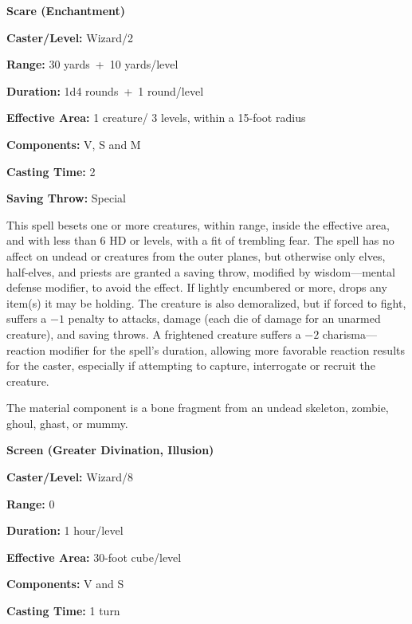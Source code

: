 \begin{multicols}{2}
\begin{minipage}{\columnwidth}
\noindent \textbf{Scare (Enchantment)}

\noindent \textbf{Caster/Level:} Wizard/2

\noindent \textbf{Range:} 30 yards~+~10 yards/level

\noindent \textbf{Duration:} 1d4 rounds~+~1 round/level

\noindent \textbf{Effective Area:} 1 creature/ 3 levels, within a 15-foot radius

\noindent \textbf{Components:} V, S and M

\noindent \textbf{Casting Time:} 2

\noindent \textbf{Saving Throw:} Special

\end{minipage}

This spell besets one or more creatures, within range, inside the effective area, and with less than 6 HD or levels, with a fit of trembling fear.  The spell has no affect on undead or creatures from the outer planes, but otherwise only elves, half-elves, and priests are granted a saving throw, modified by wisdom---mental defense modifier, to avoid the effect.  If lightly encumbered or more, drops any item(s) it may be holding.  The creature is also demoralized, but if forced to fight, suffers a $-1$ penalty to attacks, damage (each die of damage for an unarmed creature), and saving throws.  A frightened creature suffers a $-2$ charisma---reaction modifier for the spell's duration, allowing more favorable reaction results for the caster, especially if attempting to capture, interrogate or recruit the creature.

The material component is a bone fragment from an undead skeleton, zombie, ghoul, ghast, or mummy.

\vspace{1em}

\noindent
\begin{minipage}{\columnwidth}

\noindent \textbf{Screen (Greater Divination, Illusion)}

\noindent \textbf{Caster/Level:} Wizard/8

\noindent \textbf{Range:} 0

\noindent \textbf{Duration:} 1 hour/level

\noindent \textbf{Effective Area:} 30-foot cube/level

\noindent \textbf{Components:} V and S

\noindent \textbf{Casting Time:} 1 turn


\end{minipage}
\end{multicols}
